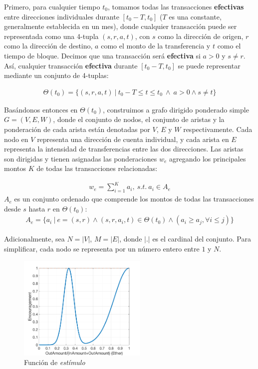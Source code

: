 Primero, para cualquier tiempo $t_0$, tomamos todas las transacciones \textbf{efectivas} entre direcciones individuales durante $[t_0- T, t_0]$ ($T$ es una constante, generalmente establecida en un mes), donde cualquier transacción puede ser representada como una 4-tupla $(s,r,a,t)$, con $s$ como la dirección de origen, $r$ como la dirección de destino, $a$ como el monto de la transferencia y $t$ como el tiempo de bloque. Decimos que una transacción será \textbf{efectiva} si $a>0$ y $s \neq r	$. Así, cualquier transacción \textbf{efectiva} durante $[t_0- T, t_0]$ se puede representar mediante un conjunto de 4-tuplas:

\begin{align}
\Theta(t_0) = \{(s, r, a, t)\ |\ t_0 - T \le t \le t_0\ \land \ a > 0 \land s \neq t \}
\end{align}

Basándonos entonces en $\Theta(t_0)$, construimos a grafo dirigido ponderado simple $G=(V,E, W)$, donde el conjunto de nodos, el conjunto de aristas y la ponderación de cada arista están denotadas por $V$, $E$ y $W$ respectivamente. Cada nodo en $V$ representa una dirección de cuenta individual, y cada arista en $E$ representa la intensidad de transferencias entre las dos direcciones. Las aristas son dirigidas y tienen asignadas las ponderaciones $w_e$ agregando los principales montos $K$ de todas las transacciones relacionadas:

\begin{align}\label{formula:edgeweight}
w_e = \sum_{i=1}^K a_i,\ s.t.\ a_i \in A_e
\end{align}
$A_e$ es un conjunto ordenado que comprende los montos de todas las transacciones desde $s$ hasta $r$ en $\Theta(t_0)$:
\begin{align}
A_e = \{a_i\ |\ e = (s,r) \land (s, r, a_i, t) \in \Theta(t_0) \land (a_i \ge a_j, \forall i \le j) \}
\end{align}

Adicionalmente, sea $N = |V|$, $M = |E|$, donde $|.|$ es el cardinal del conjunto. Para simplificar, cada nodo se representa por un número entero entre $1$ y $N$.

\begin{figure}[h]
\centering
	\includegraphics[width=0.55\textwidth]{figs/encouragement_en.png}
	\caption{Función de \textit{estímulo}}\label{fig:encouragement}
\end{figure}

